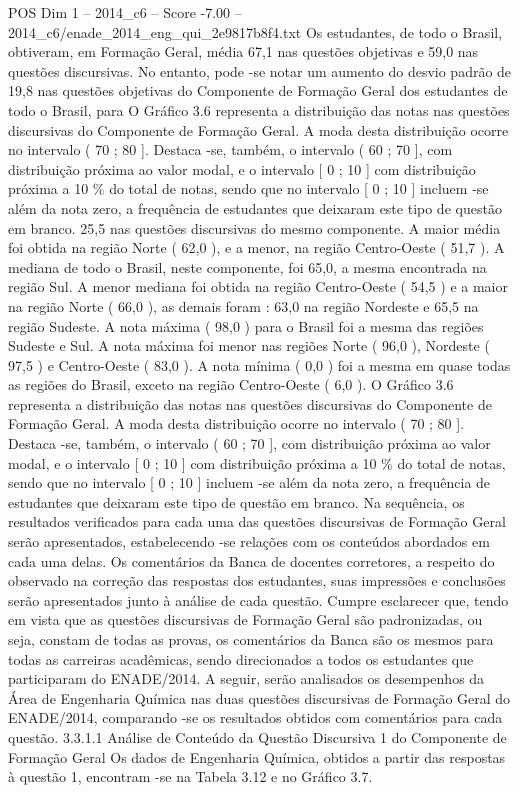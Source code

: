 \begin{textsample}{POS Dim 1 – 2014\_c6 – Score -7.00 – 2014\_c6/enade\_2014\_eng\_qui\_2e9817b8f4.txt}
Os estudantes, de todo o Brasil, obtiveram, em Formação Geral, média 67,1 nas questões objetivas e 59,0 nas questões discursivas.
No entanto, pode -se notar um aumento do desvio padrão de 19,8 nas questões objetivas do Componente de Formação Geral dos estudantes de todo o Brasil, para O Gráfico 3.6 representa a distribuição das notas nas questões discursivas do Componente de Formação Geral.
A moda desta distribuição ocorre no intervalo ( 70 ; 80 ].
Destaca -se, também, o intervalo ( 60 ; 70 ], com distribuição próxima ao valor modal, e o intervalo [ 0 ; 10 ] com distribuição próxima a 10 \% do total de notas, sendo que no intervalo [ 0 ; 10 ] incluem -se além da nota zero, a frequência de estudantes que deixaram este tipo de questão em branco. 25,5 nas questões discursivas do mesmo componente.
A maior média foi obtida na região Norte ( 62,0 ), e a menor, na região Centro-Oeste ( 51,7 ).
A mediana de todo o Brasil, neste componente, foi 65,0, a mesma encontrada na região Sul.
A menor mediana foi obtida na região Centro-Oeste ( 54,5 ) e a maior na região Norte ( 66,0 ), as demais foram : 63,0 na região Nordeste e 65,5 na região Sudeste.
A nota máxima ( 98,0 ) para o Brasil foi a mesma das regiões Sudeste e Sul.
A nota máxima foi menor nas regiões Norte ( 96,0 ), Nordeste ( 97,5 ) e Centro-Oeste ( 83,0 ).
A nota mínima ( 0,0 ) foi a mesma em quase todas as regiões do Brasil, exceto na região Centro-Oeste ( 6,0 ).
O Gráfico 3.6 representa a distribuição das notas nas questões discursivas do Componente de Formação Geral.
A moda desta distribuição ocorre no intervalo ( 70 ; 80 ].
Destaca -se, também, o intervalo ( 60 ; 70 ], com distribuição próxima ao valor modal, e o intervalo [ 0 ; 10 ] com distribuição próxima a 10 \% do total de notas, sendo que no intervalo [ 0 ; 10 ] incluem -se além da nota zero, a frequência de estudantes que deixaram este tipo de questão em branco.
Na sequência, os resultados verificados para cada uma das questões discursivas de Formação Geral serão apresentados, estabelecendo -se relações com os conteúdos abordados em cada uma delas.
Os comentários da Banca de docentes corretores, a respeito do observado na correção das respostas dos estudantes, suas impressões e conclusões serão apresentados junto à análise de cada questão.
Cumpre esclarecer que, tendo em vista que as questões discursivas de Formação Geral são padronizadas, ou seja, constam de todas as provas, os comentários da Banca são os mesmos para todas as carreiras acadêmicas, sendo direcionados a todos os estudantes que participaram do ENADE/2014.
A seguir, serão analisados os desempenhos da Área de Engenharia Química nas duas questões discursivas de Formação Geral do ENADE/2014, comparando -se os resultados obtidos com comentários para cada questão. 3.3.1.1 Análise de Conteúdo da Questão Discursiva 1 do Componente de Formação Geral Os dados de Engenharia Química, obtidos a partir das respostas à questão 1, encontram -se na Tabela 3.12 e no Gráfico 3.7.

\end{textsample}
